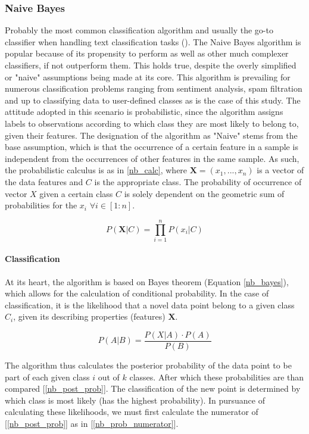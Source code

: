 \subsubsection{Naive Bayes}
	Probably the most common classification algorithm and usually the go-to classifier when handling text classification tasks (\cite{rish2001empirical}). The Naive Bayes algorithm is popular because of its propensity to perform as well as other much complexer classifiers, if not outperform them. This holds true, despite the overly simplified or "naive" assumptions being made at its core. This algorithm is prevailing for numerous classification problems ranging from sentiment analysis, spam filtration and up to classifying data to user-defined classes as is the case of this study. The attitude adopted in this scenario is probabilistic, since the algorithm assigns labels to observations according to which class  they are most likely to belong to, given their features. The designation of the algorithm as "Naive" stems from the base assumption, which is that the occurrence of a certain feature in a sample is independent from the occurrences of other features in the same sample. As such, the probabilistic calculus is as in \ref{nb_calc}, where $ \textbf{X} = (x_1,...,x_n) $ is a vector of the data features and $ C $ is the appropriate class. The probability of occurrence of vector $ X $ given a certain class $ C $ is solely dependent on the geometric sum of probabilities for the $ x_i$   $\forall i \in [1:n] $.
	
	
	\begin{equation}
		P(\textbf{X}|C) = \prod_{i=1}^n P(x_i|C)
		\label{nb_calc}
	\end{equation}
	
	\paragraph{Classification}
		At its heart, the algorithm is based on Bayes theorem (Equation \ref{nb_bayes}), which allows for the calculation of conditional probability. In the case of classification, it is the likelihood that a novel data point belong to a given class $ C_i $, given its describing properties (features) $ \textbf{X} $.
	
	\begin{equation}
		P(A|B) = \frac{P(X|A) \cdot P(A)}{P(B)}
		\label{nb_bayes}
	\end{equation}
	
		The algorithm thus calculates the posterior probability of the data point to be part of each given class $ i $  out of $ k $ classes. After which these probabilities are than compared [\ref{nb_post_prob}]. The classification of the new point is determined by which class is most likely (has the highest probability). In pursuance of calculating these likelihoods, we must first calculate the numerator of [\ref{nb_post_prob}] as in [\ref{nb_prob_numerator}].
	
